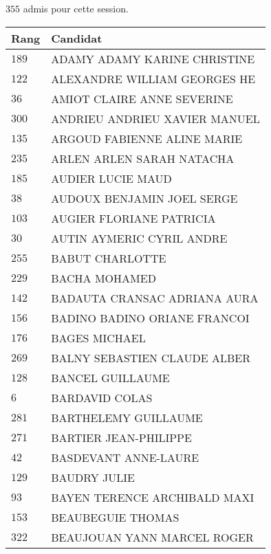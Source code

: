 




  $355$ admis pour cette session.

  \begin{xltabular}{\linewidth}{|l|X|}
    \hline
    \textbf{Rang} & \textbf{Candidat} \\
    \hline
    $189$ & ADAMY ADAMY KARINE CHRISTINE \\
    \hline
    $122$ & ALEXANDRE WILLIAM GEORGES HE \\
    \hline
    $36$ & AMIOT CLAIRE ANNE SEVERINE \\
    \hline
    $300$ & ANDRIEU ANDRIEU XAVIER MANUEL \\
    \hline
    $135$ & ARGOUD FABIENNE ALINE MARIE \\
    \hline
    $235$ & ARLEN ARLEN SARAH NATACHA \\
    \hline
    $185$ & AUDIER LUCIE MAUD \\
    \hline
    $38$ & AUDOUX BENJAMIN JOEL SERGE \\
    \hline
    $103$ & AUGIER FLORIANE PATRICIA \\
    \hline
    $30$ & AUTIN AYMERIC CYRIL ANDRE \\
    \hline
    $255$ & BABUT CHARLOTTE \\
    \hline
    $229$ & BACHA MOHAMED \\
    \hline
    $142$ & BADAUTA CRANSAC ADRIANA AURA \\
    \hline
    $156$ & BADINO BADINO ORIANE FRANCOI \\
    \hline
    $176$ & BAGES MICHAEL \\
    \hline
    $269$ & BALNY SEBASTIEN CLAUDE ALBER \\
    \hline
    $128$ & BANCEL GUILLAUME \\
    \hline
    $6$ & BARDAVID COLAS \\
    \hline
    $281$ & BARTHELEMY GUILLAUME \\
    \hline
    $271$ & BARTIER JEAN-PHILIPPE \\
    \hline
    $42$ & BASDEVANT ANNE-LAURE \\
    \hline
    $129$ & BAUDRY JULIE \\
    \hline
    $93$ & BAYEN TERENCE ARCHIBALD MAXI \\
    \hline
    $153$ & BEAUBEGUIE THOMAS \\
    \hline
    $322$ & BEAUJOUAN YANN MARCEL ROGER \\

\end{xltabular}
